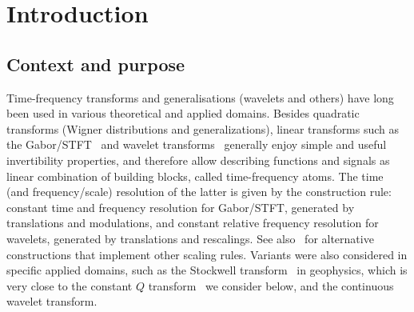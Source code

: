 \section{Introduction}\label{sec_intro}

\subsection{Context and purpose}

Time-frequency transforms and generalisations (wavelets and others) have long been used in various theoretical and applied domains. Besides quadratic transforms (Wigner distributions and generalizations), linear transforms such as the Gabor/STFT~\cite{daubechies1992ten,grochenig2013foundations} and wavelet transforms~\cite{Grossmann1984decomposition,daubechies1992ten,mallat2008wavelet,meyer1993wavelets} generally enjoy simple and useful invertibility properties, and therefore allow describing functions and signals as linear combination of building blocks, called time-frequency atoms. The time (and frequency/scale) resolution of the latter is given by the construction rule: constant time and frequency resolution for Gabor/STFT, generated by translations and modulations, and constant relative frequency resolution for wavelets, generated by translations and rescalings. See also~\cite{Kalisa1993weyl,Ali2000coherent,Fornasier2007banach} for alternative constructions that implement other scaling rules. Variants were also considered in specific applied domains, such as the Stockwell transform~\cite{Stockwell1996localization} in geophysics, which is very close to the constant $Q$ transform~\cite{Brown1991calculation,velasco2011constructing} we consider below, and the continuous wavelet transform.

